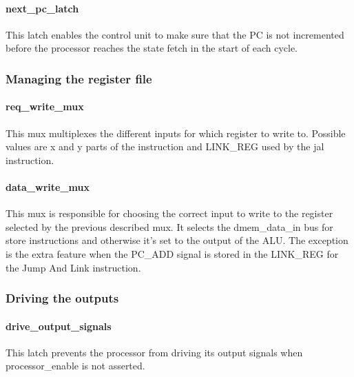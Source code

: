\paragraph{next\_pc\_latch} This latch enables the control unit to make sure that the PC is not incremented before the processor reaches the state fetch in the start of each cycle. 

\subsubsection{Managing the register file}

\paragraph{req\_write\_mux} This mux multiplexes the different inputs for which register to write to. Possible values are x and y parts of the instruction and LINK\_REG used by the jal instruction. 

\paragraph{data\_write\_mux} This mux is responsible for choosing the correct input to write to the register selected by the previous described mux. It selects the dmem\_data\_in bus for store instructions and otherwise it's set to the output of the ALU. The exception is the extra feature when the PC\_ADD signal is stored in the LINK\_REG for the Jump And Link instruction.

\subsubsection{Driving the outputs}

\paragraph{drive\_output\_signals} This latch prevents the processor from driving its output signals when processor\_enable is not asserted. 
